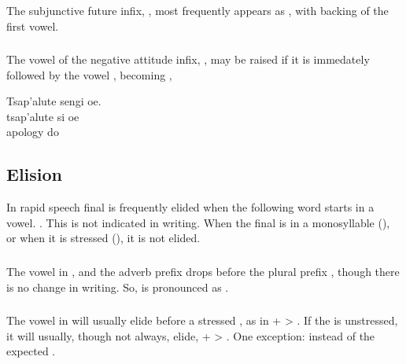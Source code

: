 \subsubsection{} The subjunctive future infix, , most
frequently appears as , with backing of the first vowel.

\subsubsection{}\label{l-and-s:eng}
The vowel of the negative attitude infix, , may be raised
if it is immedately followed by the vowel , becoming ,

\begin{interlin}
\glll Tsap'alute sengi oe. \\
      tsap'alute si oe \\
      apology do  \\
\end{interlin}


\subsection{Elision} In rapid speech final  is frequently elided
when the following word starts in a vowel.  .  This is not indicated in writing.
When the final  is in a monosyllable (), or when it is
stressed (), it is not elided.

\subsubsection{} The vowel  in ,  and the adverb
prefix  drops before the plural prefix , though there is
no change in writing.  So,   is pronounced as
. \label{l-and-s:elision-i}

\subsubsection{} The vowel in  will usually elide before a
stressed , as in  +  > . If the 
is unstressed, it will usually, though not always, elide,  +
 > . One exception:  instead of the
expected .

